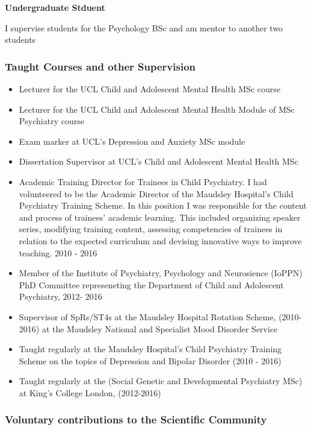 \documentclass[
]{article}
\begin{document}
\textbf{Undergraduate Stduent}

I supervise students for the Psychology BSc and am mentor to another two
students

\hypertarget{taught-courses-and-other-supervision}{%
\subsubsection{Taught Courses and other
Supervision}\label{taught-courses-and-other-supervision}}

\begin{itemize}
\item
  Lecturer for the UCL Child and Adolescent Mental Health MSc course
\item
  Lecturer for the UCL Child and Adolescent Mental Health Module of MSc
  Psychiatry course
\item
  Exam marker at UCL's Depression and Anxiety MSc module
\item
  Dissertation Supervisor at UCL's Child and Adolescent Mental Health
  MSc
\item
  Academic Training Director for Trainees in Child Psychiatry. I had
  volunteered to be the Academic Director of the Maudsley Hospital's
  Child Psychiatry Training Scheme. In this position I was responsible
  for the content and process of trainees' academic learning. This
  included organizing speaker series, modifying training content,
  assessing competencies of trainees in relation to the expected
  curriculum and devising innovative ways to improve teaching. 2010 -
  2016
\item
  Member of the Institute of Psychiatry, Psychology and Neurosience
  (IoPPN) PhD Committee represeneting the Department of Child and
  Adolescent Psychiatry, 2012- 2016
\item
  Supervisor of SpRs/ST4s at the Maudsley Hospital Rotation Scheme,
  (2010-2016) at the Maudsley National and Specialist Mood Disorder
  Service
\item
  Taught regularly at the Maudsley Hospital's Child Psychiatry Training
  Scheme on the topics of Depression and Bipolar Disorder (2010 - 2016)
\item
  Taught regularly at the (Social Genetic and Developmental Psychiatry
  MSc) at King's College London, (2012-2016)
\end{itemize}

\hypertarget{voluntary-contributions-to-the-scientific-community}{%
\subsubsection{Voluntary contributions to the Scientific
Community}\label{voluntary-contributions-to-the-scientific-community}}
\end{document}
